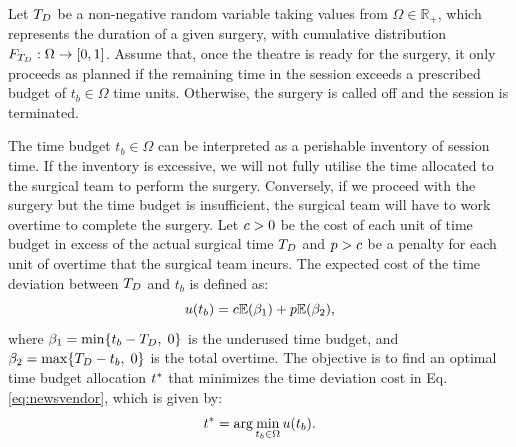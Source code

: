 Let $T_D$ be a non-negative random variable taking values from $\Omega \in \mathbb R_+$, which represents the duration of a given surgery, with cumulative distribution $F_{T_D}: \Omega \to [0,1]$. Assume that, once the theatre is ready for the surgery, it only proceeds as planned if the remaining time in the session exceeds a prescribed budget of $t_b \in \Omega$ time units. Otherwise, the surgery is called off and the session is terminated.

The time budget $t_b \in \Omega$ can be interpreted as a perishable inventory of session time. If the inventory is excessive, we will not fully utilise the time allocated to the surgical team to perform the surgery. Conversely, if we proceed with the surgery but the time budget is insufficient, the surgical team will have to work overtime to complete the surgery. Let $c > 0$ be the cost of each unit of time budget in excess of the actual surgical time $T_D$ and $p > c$ be a penalty for each unit of overtime that the surgical team incurs. The expected cost of the time deviation between $T_D$ and $t_b$ is defined as: 
%
\begin{equation} \label{eq:newsvendor}
u( t_b ) = c \mathbb{E} (\beta_1) + p \mathbb{E}( \beta_2 ), 
\end{equation}
%
where $\beta_1 = \min\{ t_b - T_D, \; 0 \}$ is the underused time budget, and $\beta_2 = \max \{ T_D - t_b, \; 0 \}$ is the total overtime. The objective is to find an optimal time budget allocation $t^{*}$ that minimizes the time deviation cost in Eq. \eqref{eq:newsvendor}, which is given by:
%
\begin{equation} \label{eq:mintimebudget}
    t^{*} =  \arg \min_{t_b \in \Omega} u( t_b ).
\end{equation}

